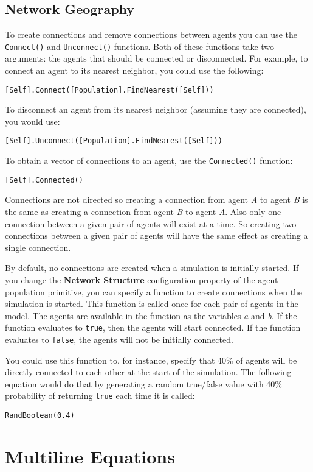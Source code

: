 \documentclass[]{memoir}
\renewcommand{\a}[1]{\textbf{#1}}
\begin{document}
\subsection{Network Geography}

To create connections and remove connections between agents you can use
the \lstinline!Connect()! and \lstinline!Unconnect()! functions. Both of
these functions take two arguments: the agents that should be connected
or disconnected. For example, to connect an agent to its nearest
neighbor, you could use the following:

\lstinline![Self].Connect([Population].FindNearest([Self]))!

To disconnect an agent from its nearest neighbor (assuming they are
connected), you would use:

\lstinline![Self].Unconnect([Population].FindNearest([Self]))!

To obtain a vector of connections to an agent, use the
\lstinline!Connected()! function:

\lstinline![Self].Connected()!

Connections are not directed so creating a connection from agent
\emph{A} to agent \emph{B} is the same as creating a connection from
agent \emph{B} to agent \emph{A}. Also only one connection between a
given pair of agents will exist at a time. So creating two connections
between a given pair of agents will have the same effect as creating a
single connection.

By default, no connections are created when a simulation is initially
started. If you change the \a{Network Structure} configuration property
of the agent population primitive, you can specify a function to create
connections when the simulation is started. This function is called once
for each pair of agents in the model. The agents are available in the
function as the variables \emph{a} and \emph{b}. If the function
evaluates to \lstinline!true!, then the agents will start connected. If
the function evaluates to \lstinline!false!, the agents will not be
initially connected.

You could use this function to, for instance, specify that 40\% of
agents will be directly connected to each other at the start of the
simulation. The following equation would do that by generating a random
true/false value with 40\% probability of returning \lstinline!true!
each time it is called:

\lstinline!RandBoolean(0.4)!

\section{Multiline Equations}
\end{document}

